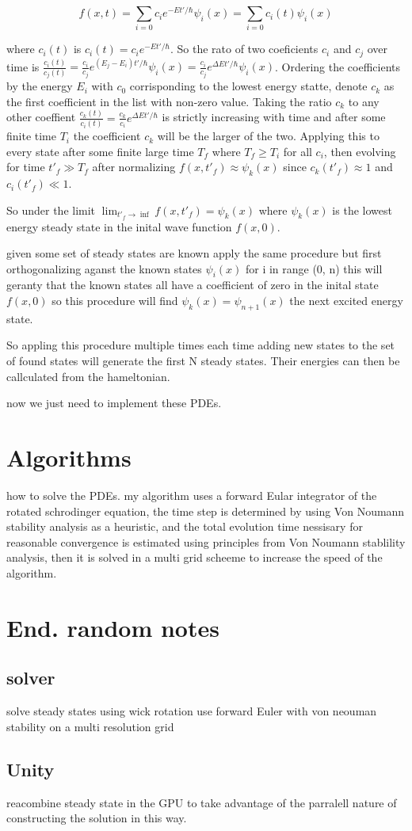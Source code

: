 \documentclass[%
 preprint,
 amsmath, amssymb, aps, pra, 10pt
]{revtex4-2}
\begin{document}
\[
f(x, t) = \sum_{i=0} c_i e^{-Et' / \hbar}\psi_i(x) = \sum_{i=0} c_i(t)\psi_i(x)
\]

where $c_i(t)$ is $c_i(t) = c_i e^{-Et' / \hbar}$. So the rato of two coeficients $c_i$ and $c_j$ over time is $\frac{c_i(t)}{c_j(t)} = \frac{c_i}{c_j} e^{(E_j - E_i)t' / \hbar}\psi_i(x) = \frac{c_i}{c_j} e^{\Delta Et' / \hbar}\psi_i(x)$. Ordering the coefficients by the energy $E_i$ with $c_0$ corrisponding to the lowest energy statte, denote $c_k$ as the first coefficient in the list with non-zero value. Taking the ratio $c_k$ to any other coeffient $\frac{c_k(t)}{c_i(t)} = \frac{c_k}{c_i} e^{\Delta Et' / \hbar}$ is strictly increasing with time and after some finite time $T_i$ the coefficient $c_k$ will be the larger of the two. Applying this to every state after some finite large time $T_f$ where $T_f \geq T_i$ for all $c_i$, then evolving for time $t'_f \gg T_f$ after normalizing $f(x, t'_f) \approx \psi_k(x)$ since $c_k(t'_f) \approx 1$ and $c_i(t'_f) \ll 1$.

So under the limit $\lim_{t'_f \to \inf} f(x, t'_f) = \psi_k(x)$ where $\psi_k(x)$ is the lowest energy steady state in the inital wave function $f(x, 0)$.

given some set of steady states are known apply the same procedure but first orthogonalizing aganst the known states $\psi_i(x)$ for i in range (0, n) this will geranty that the known states all have a coefficient of zero in the inital state $f(x, 0)$ so this procedure will find $\psi_k(x)=\psi_{n + 1}(x)$ the next excited energy state.

So appling this procedure multiple times each time adding new states to the set of found states will generate the first N steady states. Their energies can then be callculated from the hameltonian.

now we just need to implement these PDEs.

\section{Algorithms}
how to solve the PDEs. my algorithm uses a forward Eular integrator of the rotated schrodinger equation, the time step is determined by using Von Noumann stability analysis as a heuristic,
and the total evolution time nessisary for reasonable convergence is estimated using principles from Von Noumann stablility analysis, then it is solved in a multi grid scheeme to increase the speed of the algorithm.

\section{End. random notes}

\subsection{solver}
solve steady states using wick rotation
use forward Euler with von neouman stability
on a multi resolution grid
\subsection{Unity}
reacombine steady state in the GPU to take advantage of the parralell nature of constructing the solution in this way.
\end{document}
